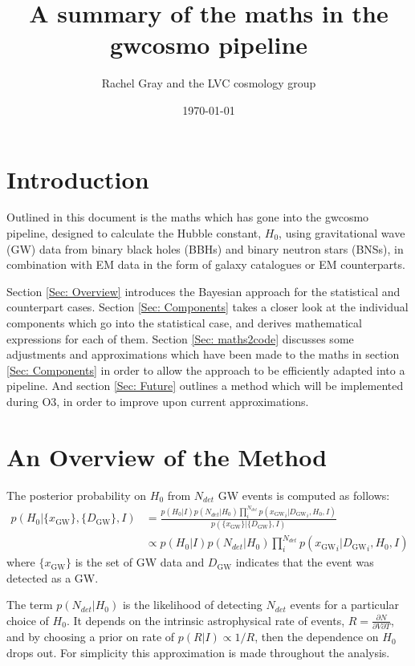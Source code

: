 \documentclass[a4paper,10pt]{article}
\title{A summary of the maths in the gwcosmo pipeline}
\author{Rachel Gray and the LVC cosmology group}
\date{\today} %
\begin{document}
\maketitle

\section{Introduction}
Outlined in this document is the maths which has gone into the gwcosmo pipeline, designed to calculate the Hubble constant, $H_0$, using gravitational wave (GW) data from binary black holes (BBHs) and binary neutron stars (BNSs), in combination with EM data in the form of galaxy catalogues or EM counterparts.

Section \ref{Sec: Overview} introduces the Bayesian approach for the statistical and counterpart cases.  Section \ref{Sec: Components} takes a closer look at the individual components which go into the statistical case, and derives mathematical expressions for each of them.  Section \ref{Sec: maths2code} discusses some adjustments and approximations which have been made to the maths in section \ref{Sec: Components} in order to allow the approach to be efficiently adapted into a pipeline.  And section \ref{Sec: Future} outlines a method which will be implemented during O3, in order to improve upon current approximations.


\section{An Overview of the Method \label{Sec: Overview}}


The posterior probability on $H_0$ from $N_{det}$ GW events is computed as follows:
\begin{equation}
\begin{aligned}
p(H_0|\{x_{\text{GW}}\},\{D_{\text{GW}}\},I)&=\frac{p(H_0|I)p(N_{det}|H_0)\prod_i^{N_{det}} p({x_{\text{GW}}}_i|{D_{\text{GW}}}_i,H_0,I)}{p(\{x_{\text{GW}}\}|\{D_{\text{GW}}\},I)}
\\ &\propto p(H_0|I)p(N_{det}|H_0)\prod_i^{N_{det}} p({x_{\text{GW}}}_i|{D_{\text{GW}}}_i,H_0,I)
\end{aligned}
\end{equation}
where $\{x_{\text{GW}}\}$ is the set of GW data and $D_{\text{GW}}$ indicates that the event was detected as a GW.

The term $p(N_{det}|H_0)$ is the likelihood of detecting $N_{det}$ events for a particular choice of $H_0$.  It depends on the intrinsic astrophysical rate of events, $R=\frac{\partial{N}}{\partial V \partial T}$, and by choosing a prior on rate of $p(R|I) \propto 1/R$, then the dependence on $H_0$ drops out. For simplicity this approximation is made throughout the analysis.
\end{document}
